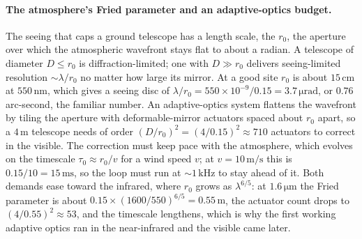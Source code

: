 \paragraph{The atmosphere's Fried parameter and an adaptive-optics budget.} The
seeing that caps a ground telescope has a length scale, the  $r_{0}$, the aperture over which the atmospheric wavefront stays
flat to about a radian. A telescope of diameter $D \le r_{0}$ is
diffraction-limited; one with $D \gg r_{0}$ delivers seeing-limited resolution
$\sim\lambda/r_{0}$ no matter how large its mirror. At a good site $r_{0}$ is
about $15\,\si{\centi\meter}$ at $550\,\si{\nano\meter}$, which gives a seeing
disc of $\lambda/r_{0} = 550\times10^{-9}/0.15 = 3.7\,\si{\micro\radian}$, or
$0.76$ arc-second, the familiar number. An adaptive-optics system flattens the
wavefront by tiling the aperture with deformable-mirror actuators spaced about
$r_{0}$ apart, so a $4\,\si{\meter}$ telescope needs of order
$(D/r_{0})^{2} = (4/0.15)^{2} \approx 710$ actuators to correct in the visible.
The correction must keep pace with the atmosphere, which evolves on the
timescale $\tau_{0} \approx r_{0}/v$ for a wind speed $v$; at
$v = 10\,\si{\meter\per\second}$ this is $0.15/10 = 15\,\si{\milli\second}$, so
the loop must run at $\sim 1\,\si{\kilo\hertz}$ to stay ahead of it. Both
demands ease toward the infrared, where $r_{0}$ grows as $\lambda^{6/5}$:
at $1.6\,\si{\micro\meter}$ the Fried parameter is about
$0.15\times(1600/550)^{6/5} = 0.55\,\si{\meter}$, the actuator count drops to
$(4/0.55)^{2}\approx 53$, and the timescale lengthens, which is why the first
working adaptive optics ran in the near-infrared and the visible came later.

